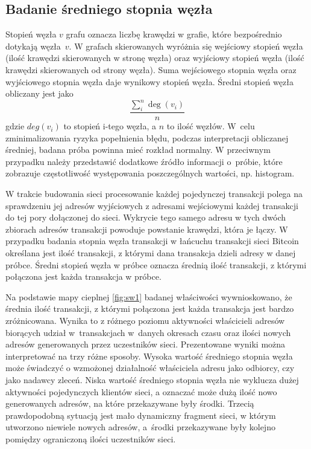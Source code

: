 \documentclass[12pt, twoside, final, openany]{mgr}
\begin{document}
\subsection{Badanie średniego stopnia węzła}
\label{stopien_wezla}
\indent Stopień węzła $v$ grafu oznacza liczbę krawędzi w grafie, które bezpośrednio dotykają węzła~$v$. W grafach skierowanych wyróżnia się wejściowy stopień węzła (ilość krawędzi skierowanych w stronę węzła) oraz wyjściowy stopień węzła (ilość krawędzi skierowanych od strony węzła). Suma wejściowego stopnia węzła oraz wyjściowego stopnia węzła daje wynikowy stopień węzła. Średni stopień węzła obliczany jest jako 
\begin{equation}
\label{eq:stopien_wezla}
  \frac{\sum_i^n\deg(v_i)}{n}
\end{equation} 
gdzie $deg(v_i)$ to stopień i-tego węzła, a $n$ to ilość węzłów. W~celu zminimalizowania ryzyka popełnienia błędu, podczas interpretacji obliczanej średniej, badana próba powinna mieć rozkład normalny. W przeciwnym przypadku należy przedstawić dodatkowe źródło informacji o~próbie, które zobrazuje częstotliwość występowania poszczególnych wartości, np. histogram. 

\indent W trakcie budowania sieci procesowanie każdej pojedynczej transakcji polega na sprawdzeniu jej adresów wyjściowych z adresami wejściowymi każdej transakcji do tej pory dołączonej do sieci. Wykrycie tego samego adresu w tych dwóch zbiorach adresów transakcji powoduje powstanie krawędzi, która je łączy. W przypadku badania stopnia węzła transakcji w łańcuchu transakcji sieci Bitcoin określana jest ilość transakcji, z którymi dana transakcja dzieli adresy w danej próbce. Średni stopień węzła w próbce oznacza średnią ilość transakcji, z którymi połączona jest każda transakcja w próbce. 

\indent Na podstawie mapy cieplnej \ref{fig:sw1} badanej właściwości wywnioskowano, że średnia ilość transakcji, z którymi połączona jest każda transakcja jest bardzo zróżnicowana. Wynika to z różnego poziomu aktywności właścicieli adresów biorących udział w~transakcjach w~danych okresach czasu oraz ilości nowych adresów generowanych przez uczestników sieci. Prezentowane wyniki można interpretować na trzy różne sposoby. Wysoka wartość średniego stopnia węzła może świadczyć o wzmożonej działalność właściciela adresu jako odbiorcy, czy jako nadawcy zleceń. Niska wartość średniego stopnia węzła nie wyklucza dużej aktywności pojedynczych klientów sieci, a oznaczać może dużą ilość nowo generowanych adresów, na które przekazywane były środki. Trzecią prawdopodobną sytuacją jest mało dynamiczny fragment sieci, w którym utworzono niewiele nowych adresów, a~środki przekazywane były kolejno pomiędzy ograniczoną ilości uczestników sieci.
\end{document}
